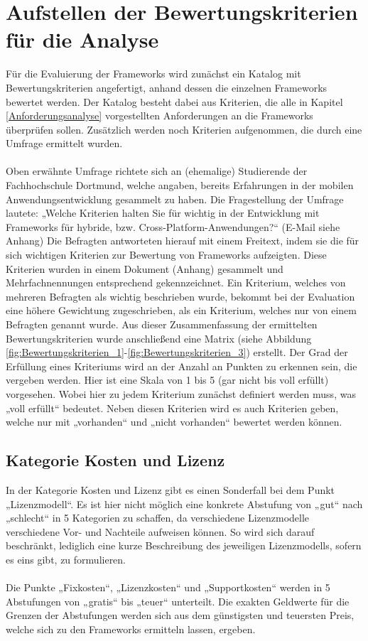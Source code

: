 \chapter{Aufstellen der Bewertungskriterien für die Analyse}

Für die Evaluierung der Frameworks wird zunächst ein Katalog mit Bewertungskriterien angefertigt, anhand dessen die einzelnen Frameworks bewertet werden. Der Katalog besteht dabei aus Kriterien, die alle in Kapitel \ref{Anforderungsanalyse} vorgestellten Anforderungen an die Frameworks überprüfen sollen. Zusätzlich werden noch Kriterien aufgenommen, die durch eine Umfrage ermittelt wurden. 
\\
\\
Oben erwähnte Umfrage richtete sich an (ehemalige) Studierende der Fachhochschule Dortmund, welche angaben, bereits Erfahrungen in der mobilen Anwendungsentwicklung gesammelt zu haben. Die Fragestellung der Umfrage lautete: „Welche Kriterien halten Sie für wichtig in der Entwicklung mit Frameworks für hybride, bzw. Cross-Platform-Anwendungen?“ (E-Mail siehe Anhang) Die Befragten antworteten hierauf mit einem Freitext, indem sie die für sich wichtigen Kriterien zur Bewertung von Frameworks aufzeigten. Diese Kriterien wurden in einem Dokument (Anhang) gesammelt und Mehrfachnennungen entsprechend gekennzeichnet. Ein Kriterium, welches von mehreren Befragten als wichtig beschrieben wurde, bekommt bei der Evaluation eine höhere Gewichtung zugeschrieben, als ein Kriterium, welches nur von einem Befragten genannt wurde. Aus dieser Zusammenfassung der ermittelten Bewertungskriterien wurde anschließend eine Matrix (siehe Abbildung \ref{fig:Bewertungskriterien_1}-\ref{fig:Bewertungskriterien_3}) erstellt. Der Grad der Erfüllung eines Kriteriums wird an der Anzahl an Punkten zu erkennen sein, die vergeben werden. Hier ist eine Skala von 1 bis 5 (gar nicht bis voll erfüllt) vorgesehen. Wobei hier zu jedem Kriterium zunächst definiert werden muss, was „voll erfüllt“ bedeutet. Neben diesen Kriterien wird es auch Kriterien geben, welche nur mit „vorhanden“ und „nicht vorhanden“ bewertet werden können.

\section{Kategorie Kosten und Lizenz} 

In der Kategorie Kosten und Lizenz gibt es einen Sonderfall bei dem Punkt „Lizenzmodell“. Es ist hier nicht möglich eine konkrete Abstufung von „gut“ nach „schlecht“ in 5 Kategorien zu schaffen, da verschiedene Lizenzmodelle verschiedene Vor- und Nachteile aufweisen können. So wird sich darauf beschränkt, lediglich eine kurze Beschreibung des jeweiligen Lizenzmodells, sofern es eins gibt, zu formulieren. 
\\
\\
Die Punkte „Fixkosten“, „Lizenzkosten“ und „Supportkosten“ werden in 5 Abstufungen von „gratis“ bis „teuer“ unterteilt. Die exakten Geldwerte für die Grenzen der Abstufungen werden sich aus dem günstigsten und teuersten Preis, welche sich zu den Frameworks ermitteln lassen, ergeben.

